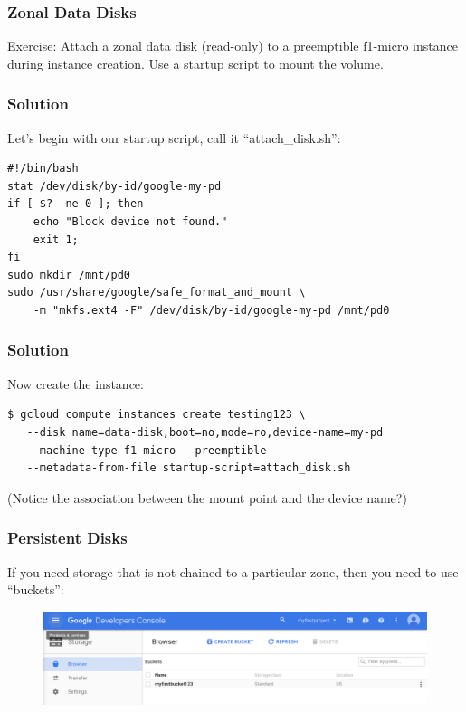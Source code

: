 \documentclass[9pt]{beamer}
\begin{document}
\begin{frame}[fragile]
\frametitle{Zonal Data Disks}
Exercise: Attach a zonal data disk (read-only) to a preemptible f1-micro instance during instance creation. Use a startup script to mount the volume.
\end{frame}

\begin{frame}[fragile]
\frametitle{Solution}
Let's begin with our startup script, call it ``attach\_disk.sh'':
\begin{verbatim}
#!/bin/bash
stat /dev/disk/by-id/google-my-pd
if [ $? -ne 0 ]; then
    echo "Block device not found."
    exit 1;
fi
sudo mkdir /mnt/pd0
sudo /usr/share/google/safe_format_and_mount \
    -m "mkfs.ext4 -F" /dev/disk/by-id/google-my-pd /mnt/pd0
\end{verbatim}
\end{frame}

\begin{frame}[fragile]
\frametitle{Solution}
Now create the instance:
\begin{verbatim}
$ gcloud compute instances create testing123 \
   --disk name=data-disk,boot=no,mode=ro,device-name=my-pd
   --machine-type f1-micro --preemptible
   --metadata-from-file startup-script=attach_disk.sh
\end{verbatim}
(Notice the association between the mount point and the device name?)
\end{frame}

\begin{frame}[fragile]
  \frametitle{Persistent Disks}
  If you need storage that is not chained to a particular zone, then you need to use ``buckets'':
  \begin{figure}
    \includegraphics[scale=0.2]{figures/Buckets.png}
  \end{figure}
\end{frame}
\end{document}
